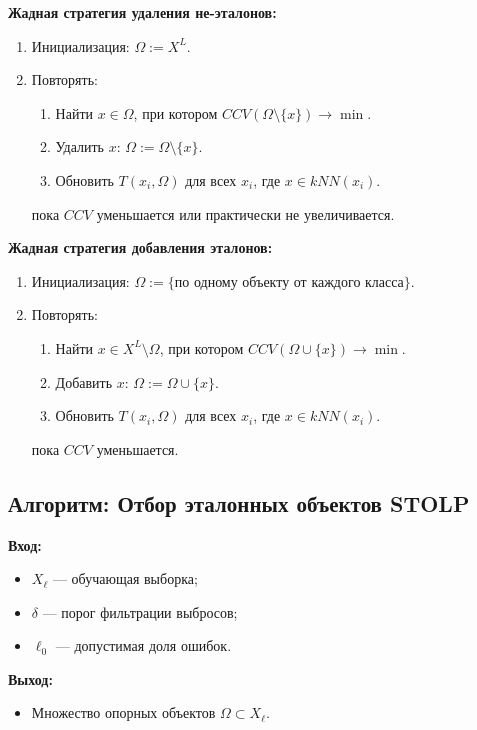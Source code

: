 \textbf{Жадная стратегия удаления не-эталонов:}
\begin{enumerate}
    \item Инициализация: $\Omega := X^L$.
    \item Повторять:
    \begin{enumerate}
        \item Найти $x \in \Omega$, при котором $CCV(\Omega \setminus \{x\}) \to \min$.
        \item Удалить $x$: $\Omega := \Omega \setminus \{x\}$.
        \item Обновить $T(x_i, \Omega)$ для всех $x_i$, где $x \in kNN(x_i)$.
    \end{enumerate}
    пока $CCV$ уменьшается или практически не увеличивается.
\end{enumerate}

\textbf{Жадная стратегия добавления эталонов:}
\begin{enumerate}
    \item Инициализация: $\Omega := \{\text{по одному объекту от каждого класса}\}$.
    \item Повторять:
    \begin{enumerate}
        \item Найти $x \in X^L \setminus \Omega$, при котором $CCV(\Omega \cup \{x\}) \to \min$.
        \item Добавить $x$: $\Omega := \Omega \cup \{x\}$.
        \item Обновить $T(x_i, \Omega)$ для всех $x_i$, где $x \in kNN(x_i)$.
    \end{enumerate}
    пока $CCV$ уменьшается.
\end{enumerate}

\subsection*{Алгоритм: Отбор эталонных объектов STOLP}
\textbf{Вход:} 
\begin{itemize}
    \item \( X_\ell \) — обучающая выборка;
    \item \( \delta \) — порог фильтрации выбросов;
    \item \( \ell_0 \) — допустимая доля ошибок.
\end{itemize}
\textbf{Выход:}
\begin{itemize}
    \item Множество опорных объектов \( \Omega \subset X_\ell \).
\end{itemize}


